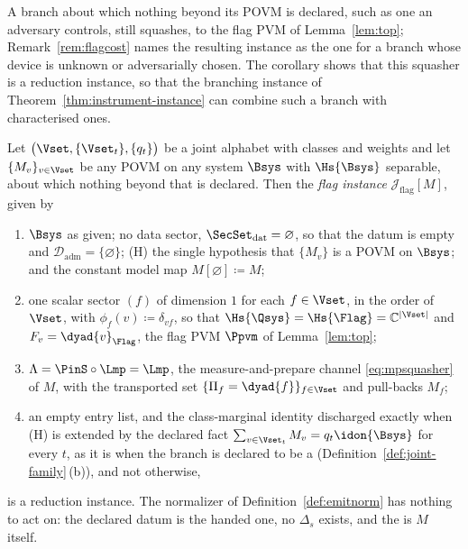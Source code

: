 
A branch about which nothing beyond its POVM is declared, such as one an
adversary controls, still squashes, to the flag PVM of
Lemma~\ref{lem:top}; Remark~\ref{rem:flagcost} names the resulting instance
as the one for a branch whose device is unknown or adversarially chosen. The
corollary shows that this squasher is a reduction instance, so that the
branching instance of Theorem~\ref{thm:instrument-instance} can combine such
a branch with characterised ones.

\begin{corollary}
\label{cor:flag-instance}
Let $\big(\Vset,\{\Vset_t\},\{q_t\}\big)$ be a joint alphabet with classes
and weights and let $\{M_v\}_{v\in\Vset}$ be any POVM on any system $\Bsys$
with $\Hs{\Bsys}$ separable, about which nothing beyond that is declared.
Then the \emph{flag instance} $\mathcal{J}_{\mathrm{flag}}[M]$, given by
\begin{enumerate}[label=(I\arabic*),leftmargin=3.0em]
\item $\Bsys$ as given; no data sector, $\SecSet_{\mathrm{dat}}=\varnothing$,
  so that the datum is empty and $\mathcal{D}_{\mathrm{adm}}=\{\varnothing\}$;
  (H) the single hypothesis that $\{M_v\}$ is a POVM on $\Bsys$; and the
  constant model map $M[\varnothing]\coloneqq M$;
\item one scalar sector $(f)$ of dimension $1$ for each $f\in\Vset$, in the
  order of $\Vset$, with $\phi_f(v)\coloneqq\delta_{vf}$, so that
  $\Hs{\Qsys}=\Hs{\Flag}=\mathbb{C}^{|\Vset|}$ and $F_v=\dyad{v}_{\Flag}$,
  the flag PVM $\Ppvm$ of Lemma~\ref{lem:top};
\item $\Lambda=\PinS\circ\Lmp=\Lmp$, the measure-and-prepare channel
  \eqref{eq:mpsquasher} of $M$, with the transported set
  $\{\Pi_f=\dyad{f}\}_{f\in\Vset}$ and pull-backs $M_f$;
\item an empty entry list, and the class-marginal identity
  discharged exactly when (H) is extended by the declared fact
  $\sum_{v\in\Vset_t}M_v=q_t\idon{\Bsys}$ for every $t$, as it is when the
  branch is declared to be a 
  (Definition~\ref{def:joint-family}\,(b)), and not otherwise,
\end{enumerate}
is a reduction instance. The normalizer of Definition~\ref{def:emitnorm} has
nothing to act on: the declared datum is the handed one, no $\Delta_s$
exists, and the  is $M$ itself.
\end{corollary}

